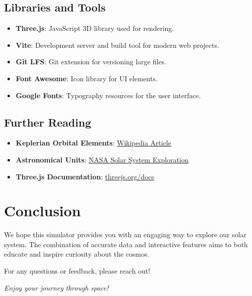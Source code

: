 \documentclass[12pt, a4paper]{article}
\begin{document}
\subsection{Libraries and Tools}

\begin{itemize}
    \item \textbf{Three.js}: JavaScript 3D library used for rendering.
    \item \textbf{Vite}: Development server and build tool for modern web projects.
    \item \textbf{Git LFS}: Git extension for versioning large files.
    \item \textbf{Font Awesome}: Icon library for UI elements.
    \item \textbf{Google Fonts}: Typography resources for the user interface.
\end{itemize}

\subsection{Further Reading}

\begin{itemize}
    \item \textbf{Keplerian Orbital Elements}: \href{https://en.wikipedia.org/wiki/Orbital_elements}{Wikipedia Article}
    \item \textbf{Astronomical Units}: \href{https://solarsystem.nasa.gov/astrophysics/solar-system/}{NASA Solar System Exploration}
    \item \textbf{Three.js Documentation}: \href{https://threejs.org/docs/}{threejs.org/docs}
\end{itemize}

\section{Conclusion}

We hope this simulator provides you with an engaging way to explore our solar
system. The combination of accurate data and interactive features aims to both
educate and inspire curiosity about the cosmos.

For any questions or feedback, please reach out!

\vfill

\begin{center}
    \textit{Enjoy your journey through space!}
\end{center}
\end{document}
